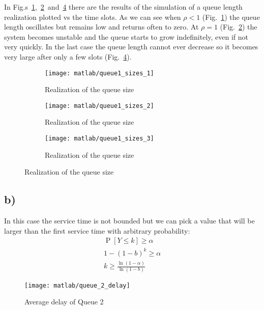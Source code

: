 \documentclass[a4paper,oneside]{article}
\newcommand{\Prob}[1]{\operatorname{P}\left[#1\right]}
\begin{document}
In
Fig.s~\ref{plot:queue1_sizes_stable},~\ref{plot:queue1_sizes_limit}~and~\ref{plot:queue1_sizes_unstable}
there are the results of the simulation of a queue length realization
plotted vs the time slots. As we can see when $\rho < 1$
(Fig.~\ref{plot:queue1_sizes_stable}) the queue length oscillates but
remains low and returns often to zero. At $\rho = 1$
(Fig.~\ref{plot:queue1_sizes_limit}) the system becomes unstable and
the queue starts to grow indefinitely, even if not very quickly. In
the last case the queue length cannot ever decrease so it becomes very
large after only a few slots (Fig.~\ref{plot:queue1_sizes_unstable}).
\begin{figure}[htbp]
  \centering
  \begin{subfigure}{0.5\textwidth}
    \centering
    \texttt{[image: matlab/queue1\_sizes\_1]}
    \caption{Realization of the queue size}
    \label{plot:queue1_sizes_stable}
  \end{subfigure}%
  \begin{subfigure}{0.5\textwidth}
    \centering
    \texttt{[image: matlab/queue1\_sizes\_2]}
    \caption{Realization of the queue size}
    \label{plot:queue1_sizes_limit}
  \end{subfigure}
  \begin{subfigure}{0.5\textwidth}
    \centering
    \texttt{[image: matlab/queue1\_sizes\_3]}
    \caption{Realization of the queue size}
    \label{plot:queue1_sizes_unstable}
  \end{subfigure}
\end{figure}

\subsection*{b)}
In this case the service time is not bounded but we can pick a value
that will be larger than the first service time with arbitrary probability:
\begin{align}
  \Prob{Y \leq k} \geq \alpha \\
  1-(1-b)^k \geq \alpha \\
  k \geq \frac{\ln(1-\alpha)}{\ln(1-b)}
\end{align}
\begin{figure}[htbp]
  \centering
    \texttt{[image: matlab/queue\_2\_delay]}
    \caption{Average delay of Queue 2}
    \label{plot:queue2_delay}
\end{figure}
\end{document}
